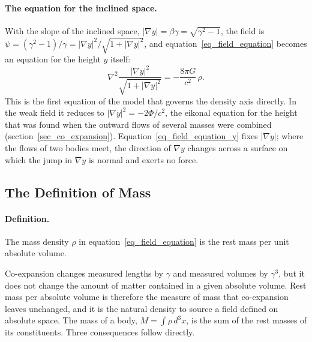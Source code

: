 \paragraph{The equation for the inclined space.} With the slope of the inclined space, $|\nabla y|=\beta\gamma=\sqrt{\gamma^2-1}$, the field is $\psi=(\gamma^2-1)/\gamma=|\nabla y|^2/\sqrt{1+|\nabla y|^2}$, and equation~\eqref{eq_field_equation} becomes an equation for the height $y$ itself:
\begin{equation}\label{eq_field_equation_y}
    \nabla^2\frac{|\nabla y|^2}{\sqrt{1+|\nabla y|^2}}=-\frac{8\pi G}{c^2}\,\rho .
\end{equation}
This is the first equation of the model that governs the density axis directly. In the weak field it reduces to $|\nabla y|^2=-2\Phi/c^2$, the eikonal equation for the height that was found when the outward flows of several masses were combined (section~\ref{sec_co_expansion}). Equation~\eqref{eq_field_equation_y} fixes $|\nabla y|$; where the flows of two bodies meet, the direction of $\nabla y$ changes across a surface on which the jump in $\nabla y$ is normal and exerts no force.

\subsection{The Definition of Mass}\label{sec_mass_definition}

\paragraph{Definition.} The mass density $\rho$ in equation~\eqref{eq_field_equation} is the rest mass per unit absolute volume.

Co-expansion changes measured lengths by $\gamma$ and measured volumes by $\gamma^3$, but it does not change the amount of matter contained in a given absolute volume. Rest mass per absolute volume is therefore the measure of mass that co-expansion leaves unchanged, and it is the natural density to source a field defined on absolute space. The mass of a body, $M=\int\rho\,d^3x$, is the sum of the rest masses of its constituents. Three consequences follow directly.

